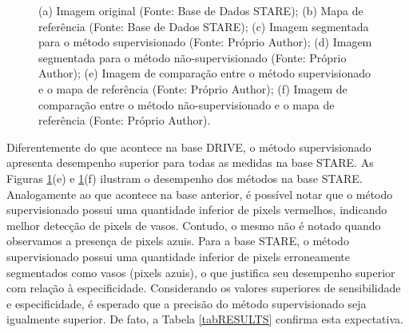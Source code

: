 \begin{figure}[!h]
    \caption{(a) Imagem original (Fonte: Base de Dados STARE); (b) Mapa de refer\^{e}ncia (Fonte: Base de Dados STARE); (c) Imagem segmentada para o m\'{e}todo supervisionado (Fonte: Pr\'{o}prio Author); (d) Imagem segmentada para o m\'{e}todo n\~{a}o-supervisionado (Fonte: Pr\'{o}prio Author); (e) Imagem de compara\c{c}\~{a}o entre o m\'{e}todo supervisionado e o mapa de refer\^{e}ncia (Fonte: Pr\'{o}prio Author); (f) Imagem de compara\c{c}\~{a}o entre o m\'{e}todo n\~{a}o-supervisionado e o mapa de refer\^{e}ncia (Fonte: Pr\'{o}prio Author).}
    \label{Fig:exemplesStare}
\end{figure}

Diferentemente do que acontece na base DRIVE, o m\'{e}todo supervisionado apresenta desempenho superior para todas as medidas na base STARE. As Figuras \ref{Fig:exemplesStare}(e) e \ref{Fig:exemplesStare}(f) ilustram o desempenho dos m\'{e}todos na base STARE. Analogamente ao que acontece na base anterior, \'{e} poss\'{i}vel notar que o m\'{e}todo supervisionado possui uma quantidade inferior de pixels vermelhos, indicando melhor detec\c{c}\~{a}o de pixels de vasos. Contudo, o mesmo n\~{a}o \'{e} notado quando observamos a presen\c{c}a de pixels azuis. Para a base STARE, o m\'{e}todo supervisionado possui uma quantidade inferior de pixels erroneamente segmentados como vasos (pixels azuis), o que justifica seu desempenho superior com rela\c{c}\~{a}o \`{a} especificidade. Considerando os valores superiores de sensibilidade e especificidade, \'{e} esperado que a precis\~{a}o do m\'{e}todo supervisionado seja igualmente superior. De fato, a Tabela \ref{tabRESULTS} confirma esta expectativa.

